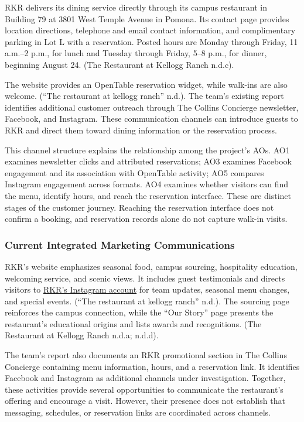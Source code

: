 \documentclass[
  12pt,
  letterpaper,
  DIV=11,
  numbers=noendperiod]{scrartcl}
\begin{document}
RKR delivers its dining service directly through its campus restaurant
in Building 79 at 3801 West Temple Avenue in Pomona. Its contact page
provides location directions, telephone and email contact information,
and complimentary parking in Lot L with a reservation. Posted hours are
Monday through Friday, 11 a.m.--2 p.m., for lunch and Tuesday through
Friday, 5--8 p.m., for dinner, beginning August 24. (The Restaurant at
Kellogg Ranch n.d.c).

The website provides an OpenTable reservation widget, while walk-ins are
also welcome. ({``The restaurant at kellogg ranch''} n.d.). The team's
existing report identifies additional customer outreach through The
Collins Concierge newsletter, Facebook, and Instagram. These
communication channels can introduce guests to RKR and direct them
toward dining information or the reservation process.

This channel structure explains the relationship among the project's
AOs. AO1 examines newsletter clicks and attributed reservations; AO3
examines Facebook engagement and its association with OpenTable
activity; AO5 compares Instagram engagement across formats. AO4 examines
whether visitors can find the menu, identify hours, and reach the
reservation interface. These are distinct stages of the customer
journey. Reaching the reservation interface does not confirm a booking,
and reservation records alone do not capture walk-in visits.

\subsubsection{Current Integrated Marketing
Communications}\label{current-integrated-marketing-communications}

RKR's website emphasizes seasonal food, campus sourcing, hospitality
education, welcoming service, and scenic views. It includes guest
testimonials and directs visitors to
\href{https://www.instagram.com/rkr_cpp/}{RKR's Instagram account} for
team updates, seasonal menu changes, and special events. ({``The
restaurant at kellogg ranch''} n.d.). The sourcing page reinforces the
campus connection, while the ``Our Story'' page presents the
restaurant's educational origins and lists awards and recognitions. (The
Restaurant at Kellogg Ranch n.d.a; n.d.d).

The team's report also documents an RKR promotional section in The
Collins Concierge containing menu information, hours, and a reservation
link. It identifies Facebook and Instagram as additional channels under
investigation. Together, these activities provide several opportunities
to communicate the restaurant's offering and encourage a visit. However,
their presence does not establish that messaging, schedules, or
reservation links are coordinated across channels.
\end{document}
